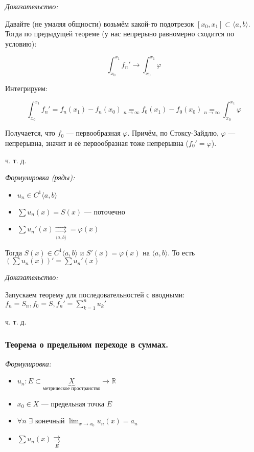 \documentclass{article}
\def\dbl{\,\,}
\def\rsh#1{\underset{#1}{\rightrightarrows}}
\def\rshe{\rsh{E}}
\begin{document}
\textit{Доказательство:}

Давайте (не умаляя общности) возьмём какой-то подотрезок $[x_0, x_1] \subset \langle a, b \rangle$. Тогда по предыдущей теореме (у нас непрерыно равномерно сходится по условию):

\[\int_{x_0}^{x_1} f_n' \longrightarrow \int_{x_0}^{x_1} \varphi \]

Интегрируем:

\[\int_{x_0}^{x_1} f_n' = f_n(x_1) - f_n(x_0) \underset{n \rightarrow \infty}{=} f_0(x_1) - f_0(x_0) \underset{n \rightarrow \infty}{=} \int_{x_0}^{x_1} \varphi \]

Получается, что $f_0$ --- первообразная $\varphi$. Причём, по Стоксу-Зайдлю, $\varphi$ --- непрерывна, значит и её первообразная тоже непрерывна ($f_0' = \varphi$).

ч. т. д. 

\textit{Формулировка (ряды):}

\begin{itemize}
    \item $u_n \in C^1\langle a, b \rangle$
    \item $\sum u_n(x) = S(x)$ --- поточечно
    \item $\sum u_n'(x) \rsh{\langle a, b \rangle} = \varphi(x)$
\end{itemize}

Тогда $S(x) \in C^1\langle a, b \rangle$ и $S'(x) = \varphi (x)$ на $\langle a, b \rangle$. То есть $\left(\sum u_n(x)\right)' = \sum u_n'(x)$

\textit{Доказательство:}

Запускаем теорему для последовательностей с вводными: $f_n = S_n, f_0 = S, f_n' = \sum_{k = 1}^n u_k'$

ч. т. д.

\subsubsection{Теорема о предельном переходе в суммах.}
\textit{Формулировка:}

\begin{itemize}
    \item $u_n: E \subset \underbrace{X}_{\text{метрическое пространство}} \rightarrow \mathbb{R}$
    \item $x_0 \in X$ --- предельная точка $E$
    \item $\forall n \dbl \exists$ конечный $\lim_{x \rightarrow x_0} u_n(x) = a_n$
    \item $\sum u_n(x) \rshe$
\end{itemize}
\end{document}
